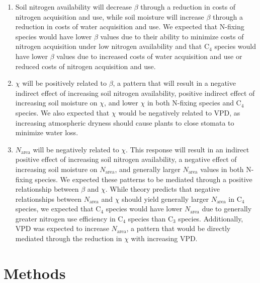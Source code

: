 \begin{enumerate}
    \item Soil nitrogen availability will decrease $\beta$ through a reduction in costs of nitrogen acquisition and use, while soil moisture will increase $\beta$ through a reduction in costs of water acquisition and use. We expected that N-fixing species would have lower $\beta$ values due to their ability to minimize costs of nitrogen acquisition under low nitrogen availability and that C$_4$ species would have lower $\beta$ values due to increased costs of water acquisition and use or reduced costs of nitrogen acquisition and use.
    
    \item $\chi$ will be positively related to $\beta$, a pattern that will result in a negative indirect effect of increasing soil nitrogen availability, positive indirect effect of increasing soil moisture on $\chi$, and lower $\chi$ in both N-fixing species and C$_4$ species. We also expected that $\chi$ would be negatively related to VPD, as increasing atmospheric dryness should cause plants to close stomata to minimize water loss.

    \item $N_\mathrm{area}$ will be negatively related to $\chi$. This response will result in an indirect positive effect of increasing soil nitrogen availability, a negative effect of increasing soil moisture on $N_\mathrm{area}$, and generally larger $N_\mathrm{area}$ values in both N-fixing species. We expected these patterns to be mediated through a positive relationship between $\beta$ and $\chi$. While theory predicts that negative relationships between $N_\mathrm{area}$ and $\chi$ should yield generally larger $N_\mathrm{area}$ in C$_4$ species, we expected that C$_4$ species would have lower $N_\mathrm{area}$ due to generally greater nitrogen use efficiency in C$_4$ species than C$_3$ species. Additionally, VPD was expected to increase $N_\mathrm{area}$, a pattern that would be directly mediated through the reduction in $\chi$ with increasing VPD.
\end{enumerate}

\section{Methods}
